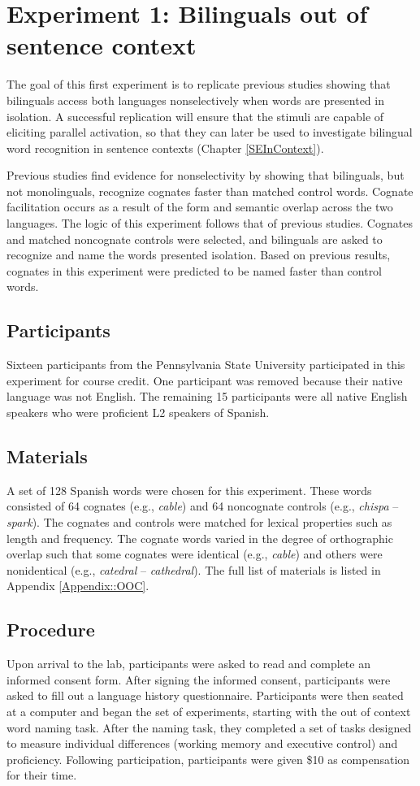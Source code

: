 \chapter{Experiment 1: Bilinguals out of sentence context}\label{ESOOC}
The goal of this first experiment is to replicate previous studies showing that bilinguals access both languages nonselectively when words are presented in isolation.  A successful replication will ensure that the stimuli are capable of eliciting parallel activation, so that they can later be used to investigate bilingual word recognition in sentence contexts (Chapter \ref{SEInContext}).

Previous studies find evidence for nonselectivity by showing that  bilinguals, but not monolinguals, recognize cognates faster than matched control words. Cognate facilitation occurs as a result of the form and semantic overlap across the two languages. The logic of this experiment follows that of previous studies. Cognates and matched noncognate controls were selected, and bilinguals are asked to recognize and name the words presented isolation. Based on previous results, cognates in this experiment were predicted to be named faster than control words.

\section{Participants}
Sixteen participants from the Pennsylvania State University participated in this experiment for course credit. One participant was removed because their native language was not English. The remaining 15 participants were all native English speakers who were proficient L2 speakers of Spanish.

\section{Materials}
A set of 128 Spanish words were chosen for this experiment. These words consisted of 64 cognates (e.g., \textit{cable}) and 64 noncognate controls (e.g., \textit{chispa} -- \textit{spark}). The cognates and controls were matched for lexical properties such as length and frequency. The cognate words varied in the degree of orthographic overlap such that some cognates were identical (e.g., \textit{cable}) and others were nonidentical (e.g., \textit{catedral} -- \textit{cathedral}). The full list of materials is listed in Appendix \ref{Appendix::OOC}.

\section{Procedure}
Upon arrival to the lab, participants were asked to read and complete an informed consent form. After signing the informed consent, participants were asked to fill out a language history questionnaire. Participants were then seated at a computer and began the set of experiments, starting with the out of context word naming task. After the naming task, they completed a set of tasks designed to measure individual differences (working memory and executive control) and proficiency. Following participation, participants were given \$10 as compensation for their time. 

